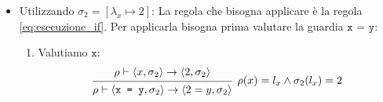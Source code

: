 \documentclass[a4paper]{article}
\begin{document}
\begin{example}
\begin{itemize}
\begin{itemize}
\begin{enumerate}
            \item Valutiamo \( \texttt{3 = 2} \):
              \[
                \rho \vdash \left< 3 = 2, \sigma_1  \right> \to
                \left< \mathcolor{Red}{false}, \sigma_1  \right>
              \]
          \end{enumerate}
          Ora che abbiamo valutato la guardia possiamo completare l'esecuzione dell'if
          applicando la regola \ref{eq:esecuzione_if}:
          \[
            \begin{prooftree}
              \hypo{ 
                \rho \vdash \left< \texttt{x = y}, \sigma_1 \right>
                \to^*_e \left< \mathcolor{Red}{false}, \sigma_1 \right>
              }
              \infer1{ 
                \begin{aligned}
                  \rho \vdash \left<
                    \texttt{if x = y then x := 5 else x := 6},
                    \sigma_1
                  \right> \\
                  \to 
                  \rho \vdash \left<
                  \texttt{if \( \mathcolor{Red}{false} \) then x := 5 else x := 6},
                    \sigma_1
                  \right>
                \end{aligned}
              }
            \end{prooftree}
          \] 
          Applichiamo l'assioma per il \texttt{false}:
          \[
            \rho \vdash
            \left<
              \texttt{if\;\( \mathcolor{Red}{false} \)\;then x := 5 else x := 6},
              \sigma_1
            \right> \to_c
            \left< \texttt{x := 6}, \sigma_1  \right>
          \] 
          Infine eseguiamo \( \texttt{x := 6} \):
          \[
            \rho \vdash \left< \texttt{x := 6}, \sigma_1  \right> \to_c
            \sigma_1[l_x \mapsto 6] = \left[ l_x \mapsto 6 \right]
          \] 

        \item Utilizzando \( \sigma_2 = \left[ \lambda_x \mapsto 2 \right] \):
          La regola che bisogna applicare è la regola \ref{eq:esecuzione_if}.
          Per applicarla bisogna prima valutare la guardia
          \( \texttt{x = y} \):
          \begin{enumerate}
            \item Valutiamo \( \texttt{x} \):
              \[
                \begin{prooftree}
                  \hypo{ 
                    \rho \vdash \left< x, \sigma_2 \right> \to
                    \left< 2, \sigma_2 \right>
                  }
                  \infer1[\( 
                    \rho(x) = l_x \land \sigma_2(l_x) = 2
                  \)]{ 
                    \rho \vdash \left< \texttt{x = y}, \sigma_2 \right> \to
                    \left< 2 = y, \sigma_2 \right>
                  }
                \end{prooftree}
              \] 


\end{enumerate}
\end{itemize}
\end{itemize}
\end{example}
\end{document}
